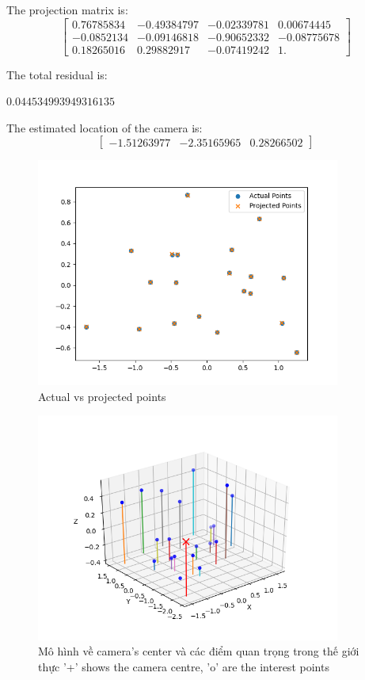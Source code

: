 \documentclass[11pt]{article}
\begin{document}
The projection matrix is:
\begin{equation*}
    \begin{bmatrix}
    0.76785834 & -0.49384797 & -0.02339781 & 0.00674445     \\
    -0.0852134 & -0.09146818 &-0.90652332  & -0.08775678    \\
    0.18265016 &  0.29882917 & -0.07419242 & 1.        
    \end{bmatrix}
\end{equation*}

The total residual is:

$0.044534993949316135$

The estimated location of the camera is:
\begin{equation*}
    \begin{bmatrix}
        -1.51263977 & -2.35165965 & 0.28266502 
    \end{bmatrix}
\end{equation*}

\begin{figure}[H]
    \centering
    \includegraphics[width=10cm]{images/part1/normalize_1.png}
    \caption{Actual vs projected points}
\end{figure}

\begin{figure}[H]
    \centering
    \includegraphics[width=10cm]{images/part1/normalize_2.png}
    \caption{Mô hình về camera's center và các điểm quan trọng trong thế giới thực '+' shows the camera centre, 'o' are the interest points}
\end{figure}
\end{document}
